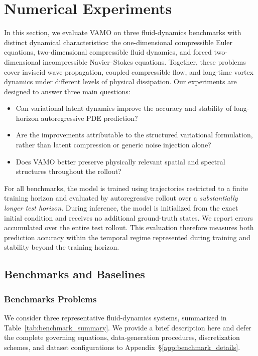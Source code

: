 \documentclass[11pt]{article}
\begin{document}
\section{Numerical Experiments}
\label{sec:experiments}

In this section, we evaluate VAMO on three fluid-dynamics benchmarks with distinct dynamical characteristics: the one-dimensional compressible Euler equations, two-dimensional compressible fluid dynamics, and forced two-dimensional incompressible Navier--Stokes equations. Together, these problems cover inviscid wave propagation, coupled compressible flow, and long-time vortex dynamics under different levels of physical dissipation. Our experiments are designed to answer three main questions:
\begin{itemize}[itemsep=0pt, topsep=2pt]
\item Can variational latent dynamics improve the accuracy and stability of long-horizon autoregressive PDE prediction?
\item Are the improvements attributable to the structured variational formulation, rather than latent compression or generic noise injection alone?
\item Does VAMO better preserve physically relevant spatial and spectral structures throughout the rollout?
\end{itemize}

For all benchmarks, the model is trained using trajectories restricted to a finite training horizon and evaluated by autoregressive rollout over a \textit{substantially longer test horizon}. During inference, the model is initialized from the exact initial condition and receives no additional ground-truth states. We report errors accumulated over the entire test rollout. This evaluation therefore measures both prediction accuracy within the temporal regime represented during training and stability beyond the training horizon.

\subsection{Benchmarks and Baselines}
\label{sec:benchmarks_baselines}

\subsubsection{Benchmarks Problems}
\label{sec:benchmarks}

We consider three representative fluid-dynamics systems, summarized in Table~\ref{tab:benchmark_summary}. We provide a brief description here and defer the complete governing equations, data-generation procedures, discretization schemes, and dataset configurations to Appendix~\S\ref{app:benchmark_details}.
\end{document}
